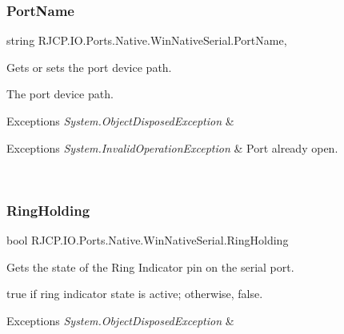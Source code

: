 \subsubsection{\texorpdfstring{PortName}{PortName}}
{\footnotesize\ttfamily string R\+J\+C\+P.\+I\+O.\+Ports.\+Native.\+Win\+Native\+Serial.\+Port\+Name\hspace{0.3cm}{\ttfamily [get]}, {\ttfamily [set]}}



Gets or sets the port device path. 

The port device path. 


\begin{DoxyExceptions}{Exceptions}
{\em System.\+Object\+Disposed\+Exception} & 
\begin{DoxyExceptions}{Exceptions}
{\em System.\+Invalid\+Operation\+Exception} & Port already open.\\
\hline
\end{DoxyExceptions}
\\
\hline
\end{DoxyExceptions}
\mbox{\label{class_r_j_c_p_1_1_i_o_1_1_ports_1_1_native_1_1_win_native_serial_a7d54b52a54d9117d27067351898e7bff}} 
\subsubsection{\texorpdfstring{RingHolding}{RingHolding}}
{\footnotesize\ttfamily bool R\+J\+C\+P.\+I\+O.\+Ports.\+Native.\+Win\+Native\+Serial.\+Ring\+Holding\hspace{0.3cm}{\ttfamily [get]}}



Gets the state of the Ring Indicator pin on the serial port. 

{\ttfamily true} if ring indicator state is active; otherwise, {\ttfamily false}. 


\begin{DoxyExceptions}{Exceptions}
{\em System.\+Object\+Disposed\+Exception} & \\
\hline
\end{DoxyExceptions}
\mbox{\label{class_r_j_c_p_1_1_i_o_1_1_ports_1_1_native_1_1_win_native_serial_a29a44c81c9193aa7687178a2219cbed1}} 
